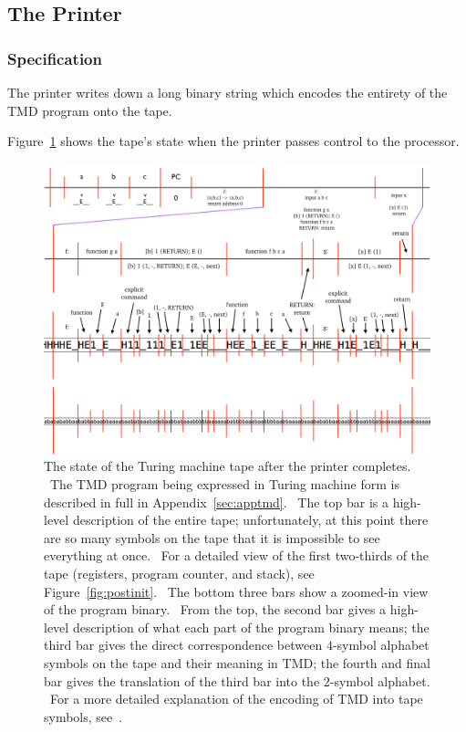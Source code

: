 \documentclass[11pt]{article}
\begin{document}
\subsection{The Printer} \label{sec:introspect}

\subsubsection{Specification}

The printer writes down a long binary string which encodes the entirety of the TMD program onto the tape.

Figure~\ref{fig:postprog} shows the tape's state when the printer passes control to the processor.

\begin{figure}
\begin{center}
\includegraphics[scale=0.42]{figs/postprog.png}
\caption{The state of the Turing machine tape after the printer completes. \ The TMD program being expressed in Turing machine form is described in full in Appendix~\ref{sec:apptmd}. \ The top bar is a high-level description of the entire tape; unfortunately, at this point there are so many symbols on the tape that it is impossible to see everything at once. \ For a detailed view of the first two-thirds of the tape (registers, program counter, and stack), see Figure~\ref{fig:postinit}. \ The bottom three bars show a zoomed-in view of the program binary. \ From the top, the second bar gives a high-level description of what each part of the program binary means; the third bar gives the direct correspondence between $4$-symbol alphabet symbols on the tape and their meaning in TMD; the fourth and final bar gives the translation of the third bar into the $2$-symbol alphabet. \ For a more detailed explanation of the encoding of TMD into tape symbols, see~\cite{github}. \label{fig:postprog}}
\end{center}
\end{figure}
\end{document}
